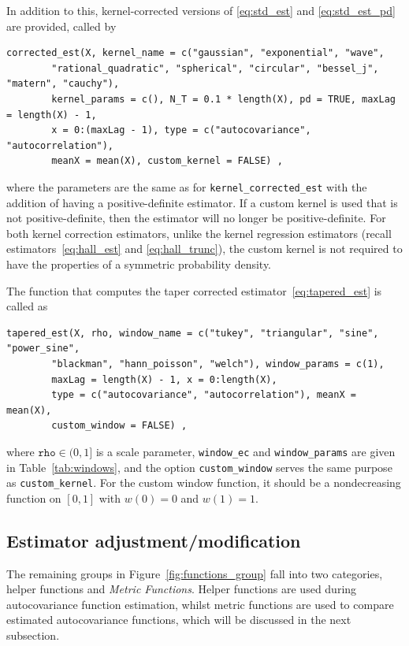 In addition to this, kernel-corrected versions of \eqref{eq:std_est} and
\eqref{eq:std_est_pd} are provided, called by

\begin{verbatim}
corrected_est(X, kernel_name = c("gaussian", "exponential", "wave",
        "rational_quadratic", "spherical", "circular", "bessel_j", "matern", "cauchy"),
        kernel_params = c(), N_T = 0.1 * length(X), pd = TRUE, maxLag = length(X) - 1,
        x = 0:(maxLag - 1), type = c("autocovariance", "autocorrelation"),
        meanX = mean(X), custom_kernel = FALSE) ,
\end{verbatim}

where the parameters are the same as for \texttt{kernel\_corrected\_est}
with the addition of having a positive-definite estimator. If a custom
kernel is used that is not positive-definite, then the estimator will no
longer be positive-definite. For both kernel correction estimators,
unlike the kernel regression estimators (recall
estimators~\eqref{eq:hall_est} and \eqref{eq:hall_trunc}), the custom
kernel is not required to have the properties of a symmetric probability
density.

The function that computes the taper corrected
estimator~\eqref{eq:tapered_est} is called as

\begin{verbatim}
tapered_est(X, rho, window_name = c("tukey", "triangular", "sine", "power_sine",
        "blackman", "hann_poisson", "welch"), window_params = c(1),
        maxLag = length(X) - 1, x = 0:length(X),
        type = c("autocovariance", "autocorrelation"), meanX = mean(X),
        custom_window = FALSE) ,
\end{verbatim}

where \(\texttt{rho} \in (0, 1]\) is a scale parameter,
\texttt{window\_ec} and \texttt{window\_params} are given in
Table~\ref{tab:windows}, and the option \texttt{custom\_window} serves
the same purpose as \texttt{custom\_kernel}. For the custom window
function, it should be a nondecreasing function on \([0, 1]\) with
\(w(0) = 0\) and \(w(1) = 1.\)

\subsection{Estimator
adjustment/modification}\label{estimator-adjustmentmodification}

The remaining groups in Figure~\ref{fig:functions_group} fall into two
categories, helper functions and \emph{Metric Functions}. Helper
functions are used during autocovariance function estimation, whilst
metric functions are used to compare estimated autocovariance functions,
which will be discussed in the next subsection.

